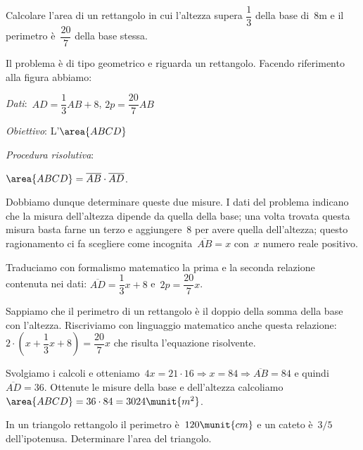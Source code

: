 \begin{problema}{}{}
 Calcolare l'area di un rettangolo in cui
l'altezza supera \(\dfrac{1}{3}\) della base di~8m e il
perimetro è~\(\dfrac{20}{7}\) della base stessa.
\end{problema}

 Il problema è di tipo geometrico e riguarda un rettangolo. Facendo riferimento 
alla figura abbiamo:
\begin{htmulticols}{2}
\emph{Dati}:~\(AD=\dfrac{1}{3}AB+8\), \quad \(2p=\dfrac{20}{7}AB\)

\emph{Obiettivo}: L'\(\area{ABCD}\)

\emph{Procedura risolutiva}:

\hspace{10mm}
\(\area{ABCD} = \overline{AB} \cdot \overline{AD}\).

{}
{}
\end{htmulticols}

Dobbiamo dunque determinare queste due misure. I dati del problema
indicano che la misura dell'altezza dipende da quella
della base; una volta trovata questa misura basta farne un terzo e
aggiungere~8 per avere quella dell'altezza; questo
ragionamento ci fa scegliere come incognita~\(\overline{AB}=x\)
con~\(x\) numero reale positivo.

Traduciamo con formalismo matematico la prima e la seconda relazione
contenuta nei dati:
\(\overline{AD}=\dfrac{1}{3}x+8\) e~\(2p=\dfrac{20}{7}x\).

Sappiamo che il perimetro di un rettangolo è il doppio della somma
della base con l'altezza. Riscriviamo con linguaggio
matematico anche questa relazione:~\(2\cdot 
\left(x+\dfrac{1}{3}x+8\right)=\dfrac{20}{7}x\)
che risulta l'equazione risolvente.

Svolgiamo i calcoli e otteniamo~\(4x=21\cdot 16\Rightarrow 
x=84\Rightarrow\overline{AB}=84\) e quindi~\(\overline{AD}=36\).
Ottenute le misure della base e dell'altezza calcoliamo 
\(\area{ABCD} = 36\cdot 84=3024\munit{{m}^{2}}\).

\begin{problema}{}{}
In un triangolo rettangolo il perimetro è~\(120\munit{cm}\) e un cateto 
è~\(3/5\) dell'ipotenusa. Determinare l'area del triangolo.
\end{problema}

